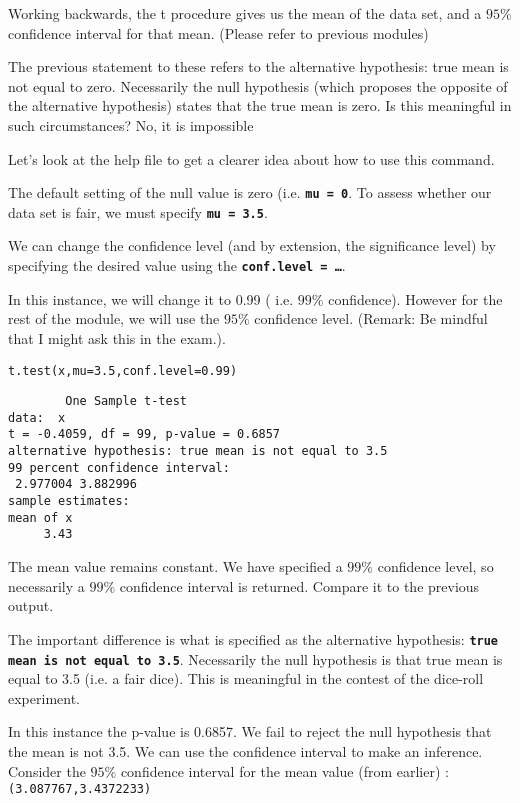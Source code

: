 \documentclass[a4paper,12pt]{article}
\begin{document}
Working backwards, the t procedure gives us the mean of the data set, and a $95\%$ confidence interval for that mean.  (Please refer to previous modules)

The previous statement to these refers to the alternative hypothesis: true mean is not equal to zero. Necessarily the null hypothesis (which proposes the opposite of the alternative hypothesis) states that the true mean is zero.
Is this meaningful in such circumstances? No, it is impossible

Let’s look at the help file to get a clearer idea about how to use this command.

The default setting of the null value is zero (i.e. \textbf{\texttt{mu = 0}}. To assess whether our data set is fair, we must specify \textbf{\texttt{mu = 3.5}}.

We can change the confidence level (and by extension,  the significance level)  by specifying the desired value using the \textbf{\texttt{conf.level = …}}.

In this instance, we will change it to 0.99 ( i.e. $99\%$ confidence). However for the rest of the module, we will use the $95\%$ confidence level. (Remark: Be mindful that I might ask this in the exam.).

\begin{framed}
\begin{verbatim}
t.test(x,mu=3.5,conf.level=0.99)
\end{verbatim}
\end{framed}

\begin{verbatim}
        One Sample t-test
data:  x
t = -0.4059, df = 99, p-value = 0.6857
alternative hypothesis: true mean is not equal to 3.5
99 percent confidence interval:
 2.977004 3.882996
sample estimates:
mean of x
     3.43
\end{verbatim}
The mean value remains constant. We have specified a $99\%$ confidence level, so necessarily a $99\%$ confidence interval is returned. Compare it to the previous output.

The important difference is what is specified as the alternative hypothesis: \textbf{\texttt{true mean is not equal to 3.5}}. Necessarily the null hypothesis is that true mean is equal to 3.5 (i.e. a fair dice). This is meaningful in the contest of the dice-roll experiment.

In this instance the p-value is 0.6857. We fail to reject the null hypothesis that the mean is not 3.5.
We can use the confidence interval to make an inference. Consider the $95\%$ confidence interval for the mean value (from earlier) : \texttt{(3.087767,3.4372233)}
\end{document}
